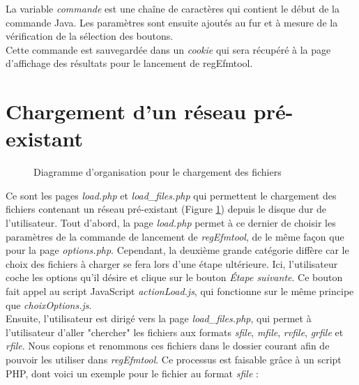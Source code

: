 La variable \textit{commande} est une chaîne de caractères qui contient le début de la commande Java. Les paramètres sont ensuite ajoutés au fur et à mesure de la vérification de la sélection des boutons. \\

Cette commande est sauvegardée dans un \textit{cookie} qui sera récupéré à la page d'affichage des résultats pour le lancement de regEfmtool. 

\section{Chargement d'un réseau pré-existant}

\begin{figure}[!ht]
	\begin{center}
		\caption{Diagramme d'organisation pour le chargement des fichiers}
  		\label{DiagLoad}
  	\end{center}	
\end{figure}

Ce sont les pages \emph{load.php} et \emph{load\_files.php} qui permettent le chargement des fichiers contenant un réseau pré-existant (Figure \ref{DiagLoad}) depuis le disque dur de l'utilisateur. Tout d'abord, la page \emph{load.php} permet à ce dernier de choisir les paramètres de la commande de lancement de \textit{regEfmtool}, de le même façon que pour la page \emph{options.php}. Cependant, la deuxième grande catégorie diffère car le choix des fichiers à charger se fera lors d'une étape ultérieure. Ici, l'utilisateur coche les options qu'il désire et clique sur le bouton \textit{Étape suivante}. Ce bouton fait appel au script JavaScript \emph{actionLoad.js}, qui fonctionne sur le même principe que \emph{choixOptions.js}. \\

Ensuite, l'utilisateur est dirigé vers la page \emph{load\_files.php}, qui permet à l'utilisateur d'aller "chercher" les fichiers aux formats \textit{sfile}, \textit{mfile}, \textit{rvfile}, \textit{grfile} et \textit{rfile}. Nous copions et renommons ces fichiers dans le dossier courant afin de pouvoir les utiliser dans \textit{regEfmtool}. Ce processus est faisable grâce à un  script PHP, dont voici un exemple pour le fichier au format \textit{sfile} :\\

